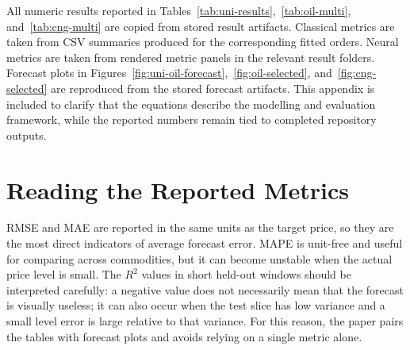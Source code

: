 \documentclass[11pt,a4paper]{article}
\begin{document}
\begin{appendices}
All numeric results reported in Tables~\ref{tab:uni-results},~\ref{tab:oil-multi}, and~\ref{tab:cng-multi} are copied from stored result artifacts. Classical metrics are taken from CSV summaries produced for the corresponding fitted orders. Neural metrics are taken from rendered metric panels in the relevant result folders. Forecast plots in Figures~\ref{fig:uni-oil-forecast},~\ref{fig:oil-selected}, and~\ref{fig:cng-selected} are reproduced from the stored forecast artifacts. This appendix is included to clarify that the equations describe the modelling and evaluation framework, while the reported numbers remain tied to completed repository outputs.

\begin{table}[h!]
\centering
\caption{Traceability map for the result tables.}\label{tab:artifact-map}
\small
{}
\end{table}

\section{Reading the Reported Metrics}\label{app:metric-reading}

RMSE and MAE are reported in the same units as the target price, so they are the most direct indicators of average forecast error. MAPE is unit-free and useful for comparing across commodities, but it can become unstable when the actual price level is small. The $R^2$ values in short held-out windows should be interpreted carefully: a negative value does not necessarily mean that the forecast is visually useless; it can also occur when the test slice has low variance and a small level error is large relative to that variance. For this reason, the paper pairs the tables with forecast plots and avoids relying on a single metric alone.


\end{appendices}
\end{document}
